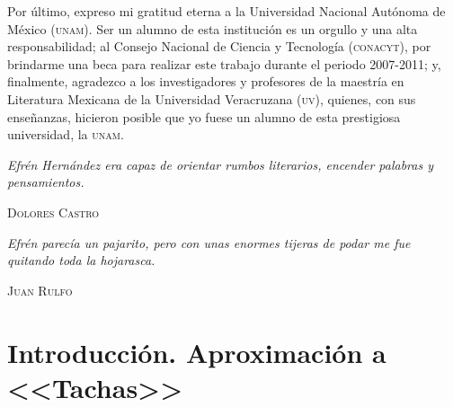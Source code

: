 \documentclass[14pt,twoside,final]{extbook} %
\begin{document}
Por último, expreso mi gratitud eterna a la Universidad Nacional Autónoma de México (\textsc{unam}). Ser un alumno de esta institución es un orgullo y una alta responsabilidad; al Consejo Nacional de Ciencia y Tecnología (\textsc{conacyt}), por brindarme una beca para realizar este trabajo durante el periodo 2007-2011; y, finalmente, agradezco a los investigadores y profesores de la maestría en Literatura Mexicana de la Universidad Veracruzana (\textsc{uv}), quienes, con sus enseñanzas, hicieron posible que yo fuese un alumno de esta prestigiosa universidad, la \textsc{unam}.
\makeatletter
\renewcommand\@dotsep{200}
\makeatother
\renewcommand{\contentsname}{Contenidos}
\tableofcontents
{}
\thispagestyle{empty}
\pagestyle{fancy}
\fancyhf{} %
\fancyhead[RO,LE]{\thepage}
\fancyfoot{}
\renewcommand{\headrulewidth}{0pt}
\setcounter{page}{7}
\newpage
\pagestyle{empty}
\null\vfill
\newpage
\pagestyle{empty}
\vspace*{42pt}
\begin{flushright}
\begin{minipage}{7.5cm} %
\emph{Efrén Hernández era capaz de orientar rumbos literarios, encender palabras y pensamientos.}
\begin{flushright}
\textsc{Dolores Castro}
\end{flushright}
\vspace*{28pt}
\emph{Efrén parecía un pajarito, pero con unas enormes tijeras de podar me fue quitando toda la hojarasca.}
\begin{flushright}
\textsc{Juan Rulfo}
\end{flushright}
\end{minipage}
\end{flushright}
\chapter*{Introducción. Aproximación a <<Tachas>>}\label{ch:introduccion-aproximacion-a-tachas}
\thispagestyle{empty}
\pagestyle{fancy}
\fancyhf{} %
\fancyhead[RO,LE]{\textlf{\thepage}}
\renewcommand{\headrulewidth}{0pt}
\setcounter{page}{11}
\end{document}
